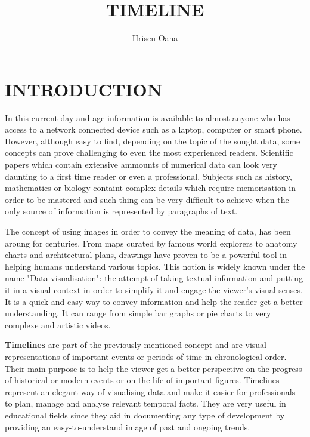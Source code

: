 \documentclass{report}
\title{TIMELINE}
\author{Hriscu Oana}
\begin{document}
  \tableofcontents
  \maketitle
  \newpage
  \setlength{\parskip}{2em}



 \section* {INTRODUCTION}
In this current day and age information is available to almost anyone who has access to a network connected device such as a laptop, computer or smart phone. However, although easy to find, depending on the topic of the sought data, some concepts can prove challenging to even the most experienced readers. Scientific papers which contain extensive ammounts of numerical data can look very daunting to a first time reader or even a professional. Subjects such as history, mathematics or biology containt complex details which require memorisation in order to be mastered and such thing can be very difficult to achieve when the only source of information is represented by paragraphs of text. \par

The concept of using images in order to convey the meaning of data, has been aroung for centuries. From maps curated by famous world explorers to anatomy charts and architectural plans, drawings have proven to be a powerful tool in helping humans understand various topics. This notion is widely known under the name "Data visualisation": the attempt of taking textual information and putting it in a visual context in order to simplify it and engage the viewer's visual senses. It is a quick and easy way to convey information and help the reader get a better understanding. It can range from simple bar graphs or pie charts to very complexe and artistic videos. \par

\textbf{Timelines} are part of the previously mentioned concept and are visual representations of important events or periods of time in chronological order. Their main purpose is to help the viewer get a better perspective on the progress of historical or modern events or on the life of important figures. Timelines represent an elegant way of visualising data and make it easier for professionals to plan, manage and analyse relevant temporal facts. They are very useful in educational fields since they aid in documenting any type of development by providing an easy-to-understand image of past and ongoing trends.\par
\end{document}
